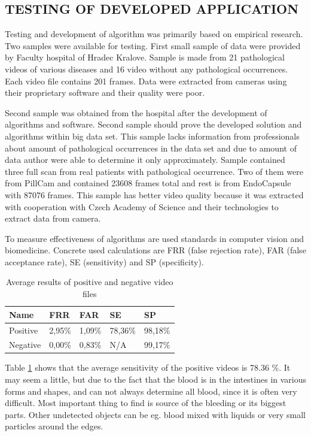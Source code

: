 \documentclass[twoside]{article}
\begin{document}
\begin{multicols}{2}
\section{TESTING OF DEVELOPED APPLICATION}

Testing and development of algorithm was primarily based on empirical research. Two samples were available for testing. First small sample of data were provided by Faculty hospital of Hradec Kralove. Sample is made from 21 pathological videos of various diseases and 16 video without any pathological occurrences. Each video file contains 201 frames. Data were extracted from cameras using their proprietary software and their quality were poor.

Second sample was obtained from the hospital after the development of algorithms and software. Second sample should prove the developed solution and algorithms within big data set. This sample lacks information from professionals about amount of pathological occurrences in the data set and due to amount of data author were able to determine it only approximately. Sample contained three full scan from real patients with pathological occurrence. Two of them were from PillCam and contained 23608 frames total and rest is from EndoCapsule with 87076 frames. This sample has better video quality because it was extracted with cooperation with Czech Academy of Science and their technologies to extract data from camera.

To measure effectiveness of algorithms are used standards in computer vision and biomedicine. Concrete used calculations are FRR (false rejection rate), FAR (false acceptance rate), SE (sensitivity) and SP (specificity).

\begin{table}[H]
	\centering
	\begin{tabular}{lllll}
		\toprule
		Name & FRR & FAR & SE & SP \\
		\midrule
		Positive & 2,95\% & 1,09\% & 78,36\% & 98,18\% \\
		Negative & 0,00\% & 0,83\% & N/A & 99,17\% \\
		\bottomrule
	\end{tabular}
	\caption{Average results of positive and negative video files}
	\label{tab:avgres}
\end{table}

Table \ref{tab:avgres} shows that the average sensitivity of the positive videos is 78.36 \%. It may seem a little, but due to the fact that the blood is in the intestines in various forms and shapes, and can not always determine all blood, since it is often very difficult. Most important thing to find is source of the bleeding or its biggest parts. Other undetected objects can be eg. blood mixed with liquids or very small particles around the edges.


\end{multicols}
\end{document}
